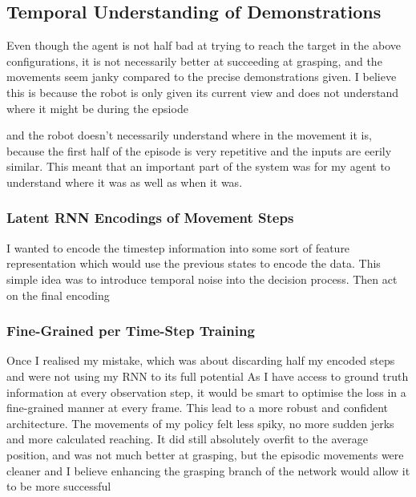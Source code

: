 \subsection{Temporal Understanding of Demonstrations}
Even though the agent is not half bad at trying to reach the target in the above configurations, it is not necessarily better at succeeding at grasping, and the movements seem janky compared to the  precise demonstrations given. I believe this is because the robot is only given its current view and does not understand where it might be during the epsiode 

and the robot doesn't necessarily understand where in the movement it is, because the first half of the episode is very repetitive and the inputs are eerily similar. This meant that an important part of the system was for my agent to understand where it was as well as when it was.

\subsubsection{Latent RNN Encodings of Movement Steps}
I wanted to encode the timestep information into some sort of feature representation which would use the previous states to encode the data. This simple idea was to introduce temporal noise into the decision process. Then act on the final encoding




\subsubsection{Fine-Grained per Time-Step Training}
Once I realised my mistake, which was about discarding half my encoded steps and were not using my RNN to its full potential  As I have access to ground truth information at every observation step, it would be smart to optimise the loss in a fine-grained manner at every frame.
This lead to a more robust and confident architecture. The movements of my policy felt less spiky, no more sudden jerks and more calculated reaching. It did still absolutely overfit to the average position, and was not much better at grasping, but the episodic movements were cleaner and I believe enhancing the grasping branch of the network would allow it to be more successful 



